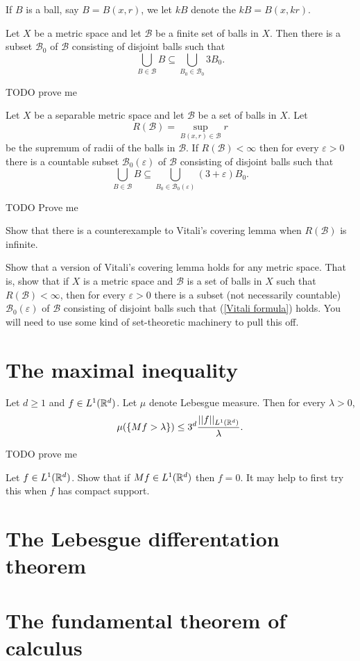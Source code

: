 \begin{definition}
If $B$ is a ball, say $B = B(x, r)$, we let $kB$ denote the  $kB = B(x, kr)$.
\end{definition}
\begin{lemma}
Let $X$ be a metric space and let $\mathcal B$ be a finite set of balls in $X$. Then there is a subset $\mathcal B_0$ of $\mathcal B$ consisting of disjoint balls such that
\[\bigcup_{B \in \mathcal B} B \subseteq \bigcup_{B_0 \in \mathcal B_0} 3B_0.\]
\end{lemma}
TODO prove me
\begin{theorem}
Let $X$ be a separable metric space and let $\mathcal B$ be a set of balls in $X$. Let
\[R(\mathcal B) = \sup_{B(x, r) \in \mathcal B} r\]
be the supremum of radii of the balls in $\mathcal B$. If $R(\mathcal B) < \infty$ then for every $\varepsilon > 0$ there is a countable subset $\mathcal B_0(\varepsilon)$ of $\mathcal B$ consisting of disjoint balls such that
\begin{equation}
\label{Vitali formula}
\bigcup_{B \in \mathcal B} B \subseteq \bigcup_{B_0 \in \mathcal B_0(\varepsilon)} (3 + \varepsilon)B_0.
\end{equation}
\end{theorem}
TODO Prove me

\begin{exercise}
Show that there is a counterexample to Vitali's covering lemma when $R(\mathcal B)$ is infinite.
\end{exercise}

\begin{exercise}
Show that a version of Vitali's covering lemma holds for any metric space.
That is, show that if $X$ is a metric space and $\mathcal B$ is a set of balls in $X$ such that $R(\mathcal B) < \infty$, then for every $\varepsilon > 0$ there is a subset (not necessarily countable) $\mathcal B_0(\varepsilon)$ of $\mathcal B$ consisting of disjoint balls such that (\ref{Vitali formula}) holds.
You will need to use some kind of set-theoretic machinery to pull this off.
\end{exercise}

\section{The maximal inequality}

\begin{theorem}
Let $d \geq 1$ and $f \in L^1(\mathbb{R}^d)$. Let $\mu$ denote Lebesgue measure. Then for every $\lambda > 0$,
\[\mu(\{Mf > \lambda\}) \leq 3^d \frac{||f||_{L^1(\mathbb{R}^d)}}{\lambda}.\]
\end{theorem}
TODO prove me

\begin{exercise}
Let $f \in L^1(\mathbb{R}^d)$.
Show that if $Mf \in L^1(\mathbb{R}^d)$ then $f = 0$.
It may help to first try this when $f$ has compact support.
\end{exercise}

\section{The Lebesgue differentation theorem}

\section{The fundamental theorem of calculus}
